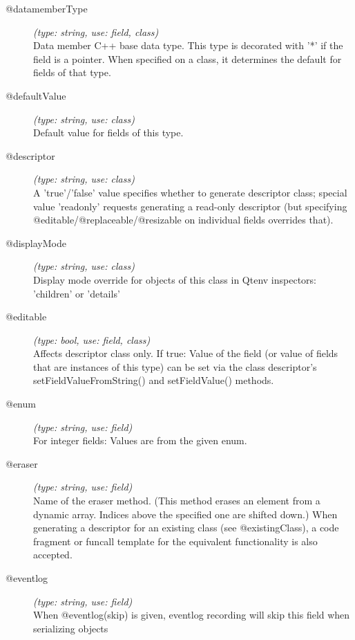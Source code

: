 \begin{description}
\item[@datamemberType] \textit{(type: string, use: field, class)} \\
  Data member C++ base data type. This type is decorated with '*' if the field
  is a pointer. When specified on a class, it determines the default for
  fields of that type.

\item[@defaultValue] \textit{(type: string, use: class)} \\
  Default value for fields of this type.

\item[@descriptor] \textit{(type: string, use: class)} \\
  A 'true'/'false' value specifies whether to generate descriptor class;
  special value 'readonly' requests generating a read-only descriptor (but
  specifying @editable/@replaceable/@resizable on individual fields overrides
  that).

\item[@displayMode] \textit{(type: string, use: class)} \\
  Display mode override for objects of this class in Qtenv inspectors:
  'children' or 'details'

\item[@editable] \textit{(type: bool, use: field, class)} \\
  Affects descriptor class only. If true: Value of the field (or value of
  fields that are instances of this type) can be set via the class
  descriptor's setFieldValueFromString() and setFieldValue() methods.

\item[@enum] \textit{(type: string, use: field)} \\
  For integer fields: Values are from the given enum.

\item[@eraser] \textit{(type: string, use: field)} \\
  Name of the eraser method. (This method erases an element from a dynamic
  array. Indices above the specified one are shifted down.) When generating a
  descriptor for an existing class (see @existingClass), a code fragment or
  funcall template for the equivalent functionality is also accepted.

\item[@eventlog] \textit{(type: string, use: field)} \\
  When @eventlog(skip) is given, eventlog recording will skip this field when
  serializing objects


\end{description}
